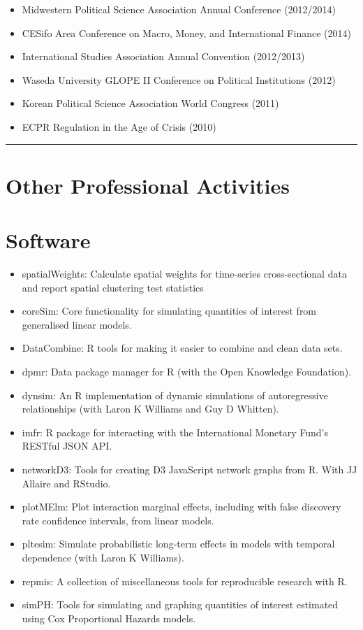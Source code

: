 \documentclass[a4paper]{article}
\begin{document}
\begin{itemize}
    \item Midwestern Political Science Association Annual Conference (2012/2014)
    \item CESifo Area Conference on Macro, Money, and International Finance (2014)
    \item International Studies Association Annual Convention (2012/2013)
    \item Waseda University GLOPE II Conference on Political Institutions (2012)
    \item Korean Political Science Association World Congress (2011)
    \item ECPR Regulation in the Age of Crisis (2010)
\end{itemize}


\vspace{0.25cm}
\medskip\hrule height 1pt
\vspace{0.5cm}

\section*{Other Professional Activities}

\section*{Software}

\begin{itemize}
    \item spatialWeights: Calculate spatial weights for time-series cross-sectional data and report spatial clustering test statistics
    \item coreSim: Core functionality for simulating quantities of interest from generalised linear models.
    \item DataCombine: R tools for making it easier to combine and clean data sets.
    \item dpmr: Data package manager for R (with the Open Knowledge Foundation).
    \item dynsim: An R implementation of dynamic simulations of autoregressive relationships (with Laron K Williams and Guy D Whitten).
    \item imfr: R package for interacting with the International Monetary Fund's RESTful JSON API.
    \item networkD3: Tools for creating D3 JavaScript network graphs from R. With JJ Allaire and RStudio.
    \item plotMElm: Plot interaction marginal effects, including with false discovery rate confidence intervals, from linear models.
    \item pltesim: Simulate probabilistic long-term effects in models with temporal dependence (with Laron K Williams).
    \item repmis: A collection of miscellaneous tools for reproducible research with R.
    \item simPH: Tools for simulating and graphing quantities of interest estimated using Cox Proportional Hazards models.
\end{itemize}
\end{document}
